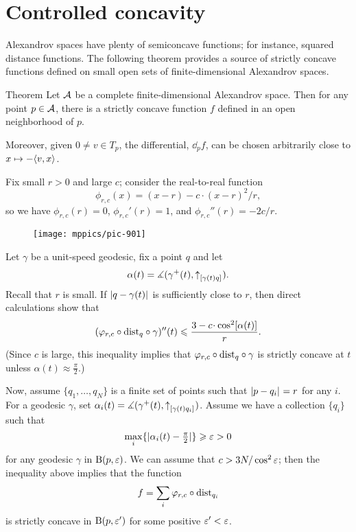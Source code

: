 \section{Controlled concavity}

Alexandrov spaces have plenty of semiconcave functions;
for instance, squared distance functions. 
The following theorem provides a source of strictly concave functions  defined on small open sets of finite-dimensional Alexandrov spaces. 

\begin{thm}{Theorem}
\label{thm:strictly-concave}
Let $\mathcal{A}$ be a complete finite-dimensional Alexandrov  space.
Then for any point $p\in \mathcal{A}$, there is  a strictly concave function $f$ defined in an
open neighborhood of $p$.

Moreover, given $0\ne v\in T_p$, the differential, $\dd_p f$, can be chosen
arbitrarily close to $x\mapsto -\langle v,x\rangle$.
\end{thm}

Fix small $r>0$ and large $c$;
consider the real-to-real function 
$$\phi_{r,c}(x)=(x-r)- c\cdot(x-r)^2/r,$$
so we have 
$\phi_{r,c}(r)=0$,
$\phi_{r,c}'(r)=1$,
and $\phi_{r,c}''(r)=- {2c}/{r}$. 

\begin{wrapfigure}{o}{44 mm}
\vskip-0mm
\centering
\texttt{[image: mppics/pic-901]}
\vskip1mm
\end{wrapfigure}

Let $\gamma$ be a unit-speed geodesic, fix a point $q$ and let 
$$\alpha(t)=\measuredangle(\gamma^+(t),{\uparrow}_{[{\gamma(t)}{q}]_{{}}}).$$
Recall that $r$ is small.
If $|{q}-{\gamma(t)}|_{}^{{}}$ is sufficiently close to
$r$, then direct calculations show that
$$(\phi_{r,c}\circ\distfun_q\circ\gamma)''(t)
\le 
\frac{3-c\cdot \cos^2[\alpha(t)]}{r}.$$
(Since $c$ is large, this inequality implies that $\varphi_{r,c}\circ\mathrm{dist}_q\circ\gamma$ is strictly concave at $t$ unless $\alpha(t)\approx\tfrac\pi2$.) 

Now, assume $\{q_1,\dots, q_N\}$ is a finite set of points such that $|{p}-{q_i}|_{}^{{}}=r$ for any $i$. 
For a geodesic $\gamma$, set $\alpha_i(t)=\measuredangle(\gamma^+(t),{\uparrow}_{[{\gamma(t)}{q_i}]_{{}}})$. 
Assume we have a collection $\{q_i\}$ such
that 
\[\max_i\{|\alpha_i(t)-\tfrac\pi2|\}\geqslant\varepsilon>0\]
for any geodesic $\gamma$ in $\mathrm{B}{}(p,\varepsilon)$. 
We can assume that $c>3N/\cos^2\varepsilon$;
then the inequality above implies that the function
$$f=\sum_i \varphi_{r,c}\circ\mathrm{dist}_{q_i}$$
is strictly concave in $\mathrm{B}{}(p,\varepsilon')$ for some positive $\varepsilon'<\varepsilon$.

